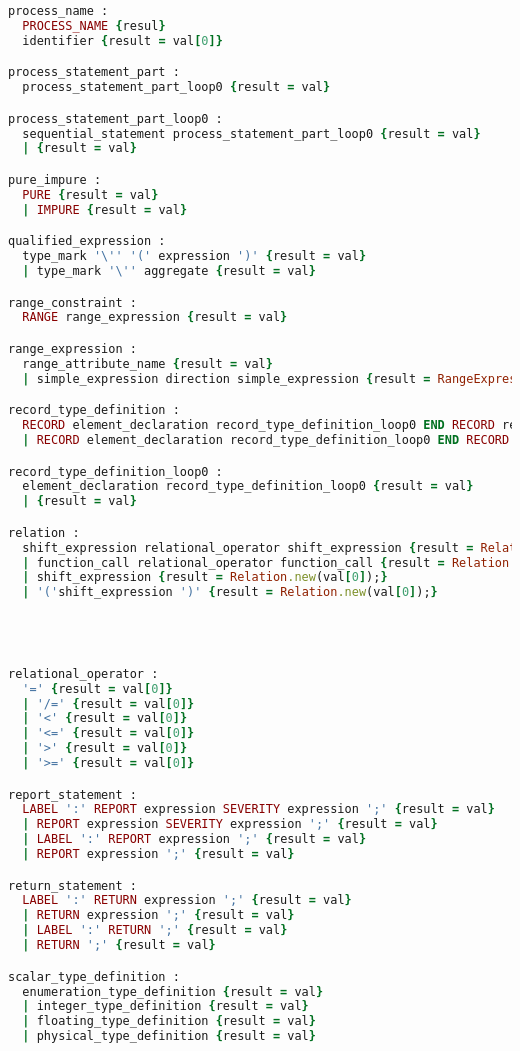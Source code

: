 \begin{lstlisting}[language=Ruby, style=rubystyle]
process_name :
  PROCESS_NAME {resul}
  identifier {result = val[0]}

process_statement_part :
  process_statement_part_loop0 {result = val}

process_statement_part_loop0 :
  sequential_statement process_statement_part_loop0 {result = val}
  | {result = val}

pure_impure :
  PURE {result = val}
  | IMPURE {result = val}

qualified_expression :
  type_mark '\'' '(' expression ')' {result = val}
  | type_mark '\'' aggregate {result = val}

range_constraint :
  RANGE range_expression {result = val}

range_expression :
  range_attribute_name {result = val}
  | simple_expression direction simple_expression {result = RangeExpression.new(val[1], val[0], val[2]);}

record_type_definition :
  RECORD element_declaration record_type_definition_loop0 END RECORD record_type_simple_name {result = val}
  | RECORD element_declaration record_type_definition_loop0 END RECORD {result = val}

record_type_definition_loop0 :
  element_declaration record_type_definition_loop0 {result = val}
  | {result = val}

relation :
  shift_expression relational_operator shift_expression {result = Relation.new(val[0], val[1], val[2]);}
  | function_call relational_operator function_call {result = Relation.new(val[0], val[1], val[2]);}
  | shift_expression {result = Relation.new(val[0]);}
  | '('shift_expression ')' {result = Relation.new(val[0]);}




relational_operator :
  '=' {result = val[0]}
  | '/=' {result = val[0]}
  | '<' {result = val[0]}
  | '<=' {result = val[0]}
  | '>' {result = val[0]}
  | '>=' {result = val[0]}

report_statement :
  LABEL ':' REPORT expression SEVERITY expression ';' {result = val}
  | REPORT expression SEVERITY expression ';' {result = val}
  | LABEL ':' REPORT expression ';' {result = val}
  | REPORT expression ';' {result = val}

return_statement :
  LABEL ':' RETURN expression ';' {result = val}
  | RETURN expression ';' {result = val}
  | LABEL ':' RETURN ';' {result = val}
  | RETURN ';' {result = val}

scalar_type_definition :
  enumeration_type_definition {result = val}
  | integer_type_definition {result = val}
  | floating_type_definition {result = val}
  | physical_type_definition {result = val}


\end{lstlisting}
